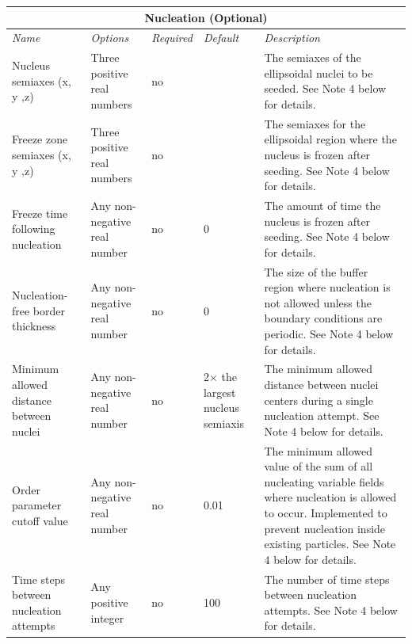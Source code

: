 \documentclass[10pt]{article} %
\begin{document}
\begin{center}
    \begin{tabular}{ | p{} | p{} | p{} | p{} | p{} |}
    \hline
      \multicolumn{5}{|c|}{\textbf{Nucleation (Optional)}} \\
    \hline
    \hline
    \emph{Name} & \emph{Options} & \emph{Required} & \emph{Default} & \emph{Description} \\ \hline
    Nucleus semiaxes (x, y ,z) & Three positive real numbers & no &  & The semiaxes of the ellipsoidal nuclei to be seeded. See Note 4 below for details. \\ \hline
     Freeze zone semiaxes (x, y ,z) & Three positive real numbers & no &  & The semiaxes for the ellipsoidal region where the nucleus is frozen after seeding. See Note 4 below for details.  \\ \hline
      Freeze time following nucleation & Any non-negative real number & no & 0 & The amount of time the nucleus is frozen after seeding. See Note 4 below for details. \\ \hline
      Nucleation-free border thickness & Any non-negative real number & no & 0 & The size of the buffer region where nucleation is not allowed unless the boundary conditions are periodic. See Note 4 below for details. \\ \hline
      Minimum allowed distance between nuclei & Any non-negative real number & no & 2$\times$ the largest nucleus semiaxis  & The minimum allowed distance between nuclei centers during a single nucleation attempt. See Note 4 below for details. \\ \hline
      Order parameter cutoff value & Any non-negative real number & no & 0.01  & The minimum allowed value of the sum of all nucleating variable fields where nucleation is allowed to occur. Implemented to prevent nucleation inside existing particles. See Note 4 below for details. \\ \hline
      Time steps between nucleation attempts & Any positive integer & no & 100  & The number of time steps between nucleation attempts. See Note 4 below for details. \\ \hline
    \end{tabular}
\end{center}
\end{document}
